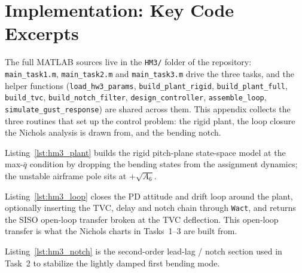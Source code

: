 \documentclass[../main.tex]{subfiles}
\begin{document}
\section{Implementation: Key Code Excerpts}\label{sec:appendix_code}

\begin{sloppypar}
The full MATLAB sources live in the \texttt{HM3/} folder of the repository: \texttt{main\_task1.m}, \texttt{main\_task2.m} and \texttt{main\_task3.m} drive the three tasks, and the helper functions (\texttt{load\_hw3\_params}, \texttt{build\_plant\_rigid}, \texttt{build\_plant\_full}, \texttt{build\_tvc}, \texttt{build\_notch\_filter}, \texttt{design\_controller}, \texttt{assemble\_loop}, \texttt{simulate\_gust\_response}) are shared across them. This appendix collects the three routines that set up the control problem: the rigid plant, the loop closure the Nichols analysis is drawn from, and the bending notch.
\end{sloppypar}

Listing~\ref{lst:hm3_plant} builds the rigid pitch-plane state-space model at the max-$\bar q$ condition by dropping the bending states from the assignment dynamics; the unstable airframe pole sits at $+\sqrt{A_6}$.



Listing~\ref{lst:hm3_loop} closes the PD attitude and drift loop around the plant, optionally inserting the TVC, delay and notch chain through \texttt{Wact}, and returns the SISO open-loop transfer broken at the TVC deflection. This open-loop transfer is what the Nichols charts in Tasks~1--3 are built from.



Listing~\ref{lst:hm3_notch} is the second-order lead-lag / notch section used in Task~2 to stabilize the lightly damped first bending mode.


\end{document}
